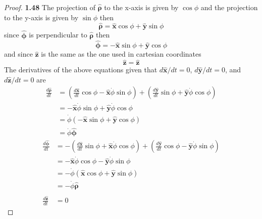 \documentclass[11pt]{article}
\newcommand{\hatx}{\bm{\hat{x}}}
\newcommand{\haty}{\bm{\hat{y}}}
\newcommand{\hatz}{\bm{\hat{z}}}
\newcommand{\hatphi}{\bm{\hat{\phi}}}
\newcommand{\hatrho}{\bm{\hat{\rho}}}
\begin{document}
\cleardoublepage
    \begin{proof}{\textbf{1.48}}
        The projection of $\hatrho$ to the x-axis is given by $\cos{\phi}$ and
        the projection to the y-axis is given by $\sin{\phi}$ then
        $$\hatrho = \hatx \cos{\phi} + \haty \sin{\phi}$$
        since $\hatphi$ is perpendicular to $\hatrho$ then
        $$\hatphi = - \hatx \sin{\phi} + \haty \cos{\phi}$$
        and since $\hatz$ is the same as the one used in cartesian coordinates
        $$\hatz = \hatz$$
        The derivatives of the above equations given that $d\hatx/dt = 0$,
        $d\haty/dt = 0$, and $d\hatz/dt = 0$ are
        \begin{align*}
            \frac{d\hatrho}{dt} &= (
                \frac{d\hatx}{dt} \cos{\phi} - \hatx \dot{\phi}\sin{\phi}
            ) + (
                \frac{d\haty}{dt} \sin{\phi} + \haty \dot{\phi}\cos{\phi}
            ) \\
                                &= - \hatx \dot{\phi}\sin{\phi} + \haty \dot{\phi}\cos{\phi} \\
                                &= \dot{\phi} (-\hatx\sin{\phi} + \haty\cos{\phi}) \\
                                &= \dot{\phi} \hatphi
        \end{align*}
        \begin{align*}
            \frac{d\hatphi}{dt} &= -(
                \frac{d\hatx}{dt} \sin{\phi} + \hatx \dot{\phi}\cos{\phi}
            ) + (
                \frac{d\haty}{dt} \cos{\phi} - \haty \dot{\phi}\sin{\phi}
            ) \\
                                &= - \hatx \dot{\phi}\cos{\phi} - \haty \dot{\phi}\sin{\phi} \\
                                &= -\dot{\phi}(\hatx\cos{\phi} + \haty\sin{\phi}) \\
                                &= -\dot{\phi}\hatrho \\ \\
              \frac{d\hatz}{dt} &= 0
        \end{align*}        
    \end{proof}
\end{document}
